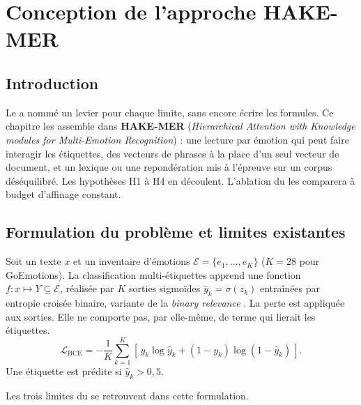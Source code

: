\chapter{Conception de l'approche HAKE-MER}

\section*{Introduction}
Le  a nommé un levier pour chaque limite, sans encore
écrire les formules. Ce chapitre les assemble dans \textbf{HAKE-MER}
(\emph{Hierarchical Attention with Knowledge modules for Multi-Emotion
Recognition}) : une lecture par émotion qui peut faire interagir les
étiquettes, des vecteurs de phrases à la place d'un seul vecteur de
document, et un lexique ou une repondération mis à l'épreuve sur un
corpus déséquilibré. Les hypothèses H1 à H4 en découlent. L'ablation du
 les comparera à budget d'affinage constant.

\section{Formulation du problème et limites existantes}
\label{sec:conception-formulation}

Soit un texte $x$ et un inventaire d'émotions
$\mathcal{E}=\{e_1,\dots,e_K\}$ ($K{=}28$ pour GoEmotions).
La classification multi-étiquettes apprend une
fonction $f : x \mapsto Y \subseteq \mathcal{E}$, réalisée par $K$
sorties sigmoïdes $\hat{y}_k = \sigma(z_k)$ entraînées par entropie
croisée binaire, variante de la \emph{binary relevance}
\cite{zhang2014multilabel,boutell2004multilabel}. La perte est appliquée
aux sorties. Elle ne comporte pas, par elle-même, de terme qui lierait
les étiquettes.
\begin{equation}
\mathcal{L}_{\mathrm{BCE}}
= -\frac{1}{K}\sum_{k=1}^{K}
\left[\, y_k \log \hat{y}_k + (1-y_k)\log(1-\hat{y}_k) \,\right].
\label{eq:bce}
\end{equation}
Une étiquette est prédite si $\hat{y}_k > 0{,}5$.

Les trois limites du  se retrouvent dans cette
formulation.

